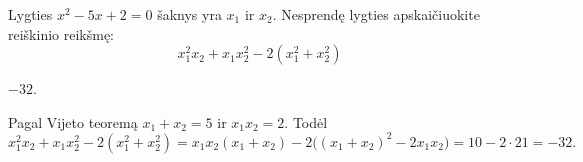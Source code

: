 \begin{salyga}
Lygties $x^2 - 5x + 2 = 0$ šaknys yra $x_1$ ir $x_2$. Nesprendę lygties apskaičiuokite reiškinio reikšmę:
    \[ x_1^2 x_2 + x_1 x_2^2 - 2(x_1^2 + x_2^2) \]
\end{salyga}

\begin{atsakymas}
$-32$.
\end{atsakymas}

\begin{sprendimas}
Pagal Vijeto teoremą $x_1+x_2=5$ ir $x_1x_2=2$. Todėl
\[
x_1^2x_2+x_1x_2^2-2(x_1^2+x_2^2)
=x_1x_2(x_1+x_2)-2\bigl((x_1+x_2)^2-2x_1x_2\bigr)
=10-2\cdot21=-32.
\]
\end{sprendimas}
